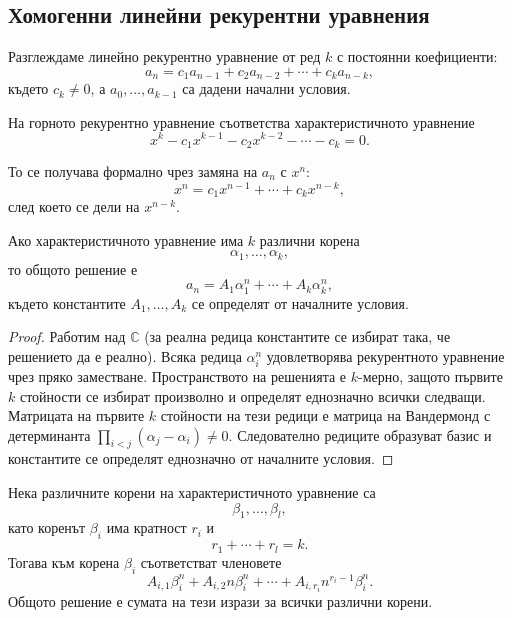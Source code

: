 \subsection{Хомогенни линейни рекурентни уравнения}\label{s:2.4.1}

Разглеждаме линейно рекурентно уравнение от ред $k$ с постоянни коефициенти:
\[
a_n=c_1a_{n-1}+c_2a_{n-2}+\cdots+c_ka_{n-k},
\]
където $c_k\neq 0$, а $a_0,\ldots,a_{k-1}$ са дадени начални условия.

\begin{keydefn}
На горното рекурентно уравнение съответства характеристичното уравнение
\[
x^k-c_1x^{k-1}-c_2x^{k-2}-\cdots-c_k=0.
\]
\end{keydefn}

То се получава формално чрез замяна на $a_n$ с $x^n$:
\[
x^n=c_1x^{n-1}+\cdots+c_kx^{n-k},
\]
след което се дели на $x^{n-k}$.

\begin{thm}
Ако характеристичното уравнение има $k$ различни корена
\[
\alpha_1,\ldots,\alpha_k,
\]
то общото решение е
\[
a_n=A_1\alpha_1^n+\cdots+A_k\alpha_k^n,
\]
където константите $A_1,\ldots,A_k$ се определят от началните условия.
\end{thm}

\begin{proof}
Работим над $\mathbb C$ (за реална редица константите се избират така, че решението да е реално). Всяка редица $\alpha_i^n$ удовлетворява рекурентното уравнение чрез пряко заместване. Пространството на решенията е $k$-мерно, защото първите $k$ стойности се избират произволно и определят еднозначно всички следващи. Матрицата на първите $k$ стойности на тези редици е матрица на Вандермонд с детерминанта $\prod_{i<j}(\alpha_j-\alpha_i)\ne0$. Следователно редиците образуват базис и константите се определят еднозначно от началните условия.
\end{proof}

\begin{thm}
Нека различните корени на характеристичното уравнение са
\[
\beta_1,\ldots,\beta_l,
\]
като коренът $\beta_i$ има кратност $r_i$ и
\[
r_1+\cdots+r_l=k.
\]
Тогава към корена $\beta_i$ съответстват членовете
\[
A_{i,1}\beta_i^n+
A_{i,2}n\beta_i^n+
\cdots+
A_{i,r_i}n^{r_i-1}\beta_i^n.
\]
Общото решение е сумата на тези изрази за всички различни корени.
\end{thm}

